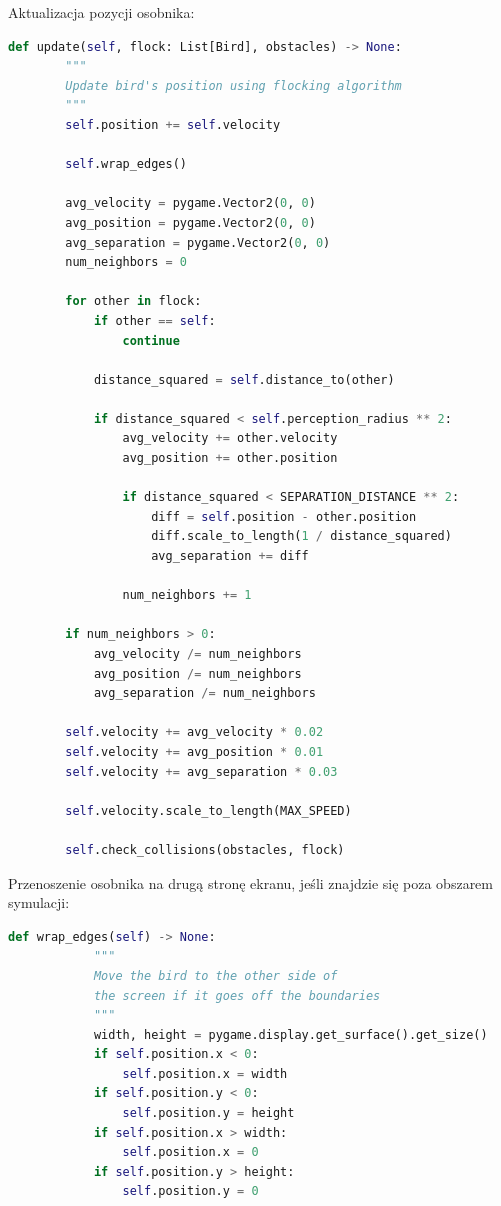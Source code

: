 \documentclass[12pt,a4paper,table]{article}
\begin{document}
    \raggedright
    \newpage
    Aktualizacja pozycji osobnika:
    \begin{lstlisting}[language=Python]
    def update(self, flock: List[Bird], obstacles) -> None:
        """
        Update bird's position using flocking algorithm
        """
        self.position += self.velocity

        self.wrap_edges()

        avg_velocity = pygame.Vector2(0, 0)
        avg_position = pygame.Vector2(0, 0)
        avg_separation = pygame.Vector2(0, 0)
        num_neighbors = 0

        for other in flock:
            if other == self:
                continue

            distance_squared = self.distance_to(other)

            if distance_squared < self.perception_radius ** 2:
                avg_velocity += other.velocity
                avg_position += other.position

                if distance_squared < SEPARATION_DISTANCE ** 2:
                    diff = self.position - other.position
                    diff.scale_to_length(1 / distance_squared)
                    avg_separation += diff

                num_neighbors += 1

        if num_neighbors > 0:
            avg_velocity /= num_neighbors
            avg_position /= num_neighbors
            avg_separation /= num_neighbors

        self.velocity += avg_velocity * 0.02
        self.velocity += avg_position * 0.01
        self.velocity += avg_separation * 0.03

        self.velocity.scale_to_length(MAX_SPEED)

        self.check_collisions(obstacles, flock)
    \end{lstlisting}

    \raggedright
    \newpage
    Przenoszenie osobnika na drugą stronę ekranu, jeśli znajdzie się poza obszarem symulacji:
    \begin{lstlisting}[language=Python]
        def wrap_edges(self) -> None:
            """
            Move the bird to the other side of 
            the screen if it goes off the boundaries
            """
            width, height = pygame.display.get_surface().get_size()
            if self.position.x < 0:
                self.position.x = width
            if self.position.y < 0:
                self.position.y = height
            if self.position.x > width:
                self.position.x = 0
            if self.position.y > height:
                self.position.y = 0
    \end{lstlisting}
\end{document}
